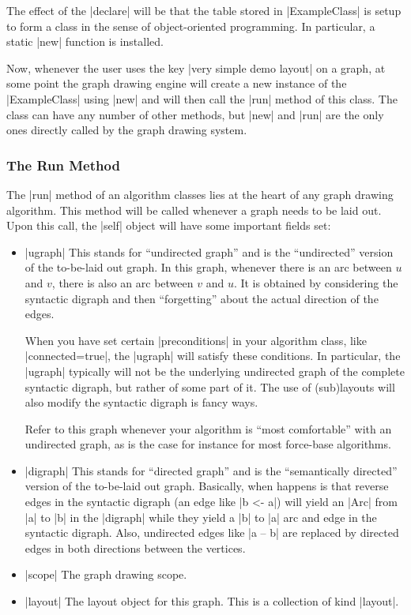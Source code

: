 The effect of the |declare| will be that the table stored in
|ExampleClass| is setup to form a class in the sense of
object-oriented programming. In particular,  a static |new| function
is installed.

Now, whenever the user uses the key |very simple demo layout| on a
graph, at some point the graph drawing engine will create a new
instance of the |ExampleClass| using |new| and will then call the
|run| method of this class. The class can have any number of other
methods, but |new| and |run| are the only ones directly called by the
graph drawing system.


\subsubsection{The Run Method}

The |run| method of an algorithm classes lies at the heart of any
graph drawing algorithm. This method will be called whenever a graph
needs to be laid out. Upon this call, the |self| object will have
some important fields set:
\begin{itemize}
\item |ugraph| This stands for ``undirected graph'' and is the
  ``undirected'' version of the to-be-laid out graph. In this graph,
  whenever there is an arc between $u$ and $v$, there is also an arc
  between $v$ and $u$. It is obtained by considering the syntactic
  digraph and then ``forgetting'' about the actual direction of the
  edges.

  When you have set certain |preconditions| in your algorithm class,
  like |connected=true|, the |ugraph| will satisfy these
  conditions. In particular, the |ugraph| typically will not be the
  underlying undirected graph of the complete syntactic digraph, but
  rather of some part of it. The use of (sub)layouts will also modify
  the syntactic digraph is fancy ways.

  Refer to this graph whenever your algorithm is ``most comfortable''
  with an undirected graph, as is the case for instance for most
  force-base algorithms.
\item |digraph| This stands for ``directed graph'' and is the
  ``semantically directed'' version of the to-be-laid out
  graph. Basically, when happens is that reverse edges in the
  syntactic digraph (an edge like |b <- a|) will yield an |Arc| from
  |a| to |b| in the |digraph| while they yield a |b| to |a| arc and
  edge in the syntactic digraph. Also, undirected edges like |a -- b|
  are replaced by directed edges in both directions between the
  vertices.
\item |scope| The graph drawing scope.
\item |layout| The layout object for this graph. This is a collection
  of kind |layout|. 
\end{itemize}


